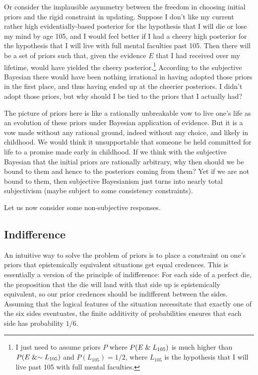 Or consider the implausible asymmetry between the freedom in choosing initial priors and the
rigid constraint in updating. Suppose I don't like my current rather high evidentially-based posterior for 
the hypothesis that I will die or lose my mind by age 105, and I would feel better if I had a cheery high posterior for 
the hypothesis that I will live with full mental faculties past 105.  Then there will be a set of priors 
such that, given the evidence $E$ that I had received over my lifetime, would have yielded the cheery 
posterior.\footnote{I just need to assume priors $P$ where $P(E\mathrel{\&} L_{105})$ is much higher than 
$P(E\mathrel{\&} \sim L_{105})$ and $P(L_{105})=1/2$, where $L_{105}$ is the hypothesis that I will live past 105 with full mental faculties.} According to 
the subjective Bayesian there would have been nothing irrational in having adopted those priors in 
the first place, and thus having ended up at the cheerier posteriors. I didn't adopt those priors, 
but why should I be tied to the priors that I actually had? 

The picture of priors here is like a rationally unbreakable vow to live one's life as an evolution
of these priors under Bayesian application of evidence. But it is a vow made without any rational 
ground, indeed without any choice, and likely in childhood. We would think it unsupportable that
someone be held committed for life to a promise made early in childhood. If we think with the subjective
Bayesian that the initial priors are rationally arbitrary, why then should we be bound to
them and hence to the posteriors coming from them? Yet if we are not bound to them, then subjective
Bayesianism just turns into nearly total subjectivism (maybe subject to some consistency constraints).

Let us now consider some non-subjective responses.

\subsection{Indifference}
An intuitive way to solve the problem of priors is to place a constraint on one's priors that 
epistemically equivalent situations get equal credences. This is essentially a version of the 
principle of indifference: For each side of a perfect die, the proposition that the die will land 
with that side up is epistemically equivalent, so our prior credences should be indifferent between
the sides. Assuming that the logical features of the situation necessitate that exactly one of the six 
sides eventuates, the finite additivity of probabilities ensures that each side has probability $1/6$.

